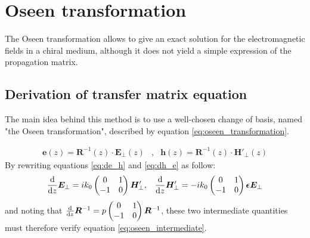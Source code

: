 \section{Oseen transformation}

The Oseen transformation allows to give an exact solution for the electromagnetic fields in a chiral medium, although it does not yield a simple expression of the propagation matrix.

\subsection{Derivation of transfer matrix equation}

The main idea behind this method is to use a well-chosen change of basis, named "the Oseen transformation", described by equation \ref{eq:oseen_transformation}.

\begin{eqnarray}
\bm{e}(z) = \bm{R}^{-1}(z)\cdot\bm{E}_\perp(z) &,& \bm{h}(z) = \bm{R}^{-1}(z)\cdot\bm{H}'_\perp(z) \label{eq:oseen_transformation}
\end{eqnarray}
%
By rewriting equations \ref{eq:de_h} and \ref{eq:dh_e} as follow:
\begin{eqnarray}
\dv{z}\bm{E}_\perp = ik_0\begin{pmatrix}
0 & 1\\-1 & 0
\end{pmatrix}\bm{H}'_\perp&,&
\dv{z}\bm{H}'_\perp = -ik_0\begin{pmatrix}
0 & 1\\-1 & 0
\end{pmatrix}\bm{\epsilon}\bm{E}_\perp
\end{eqnarray}
%
and noting that $\dv{z}\bm{R}^{-1} = p\begin{pmatrix}
0 & 1 \\ -1 & 0
\end{pmatrix} \bm{R}^{-1}$, these two intermediate quantities must therefore verify equation \ref{eq:oseen_intermediate}.

